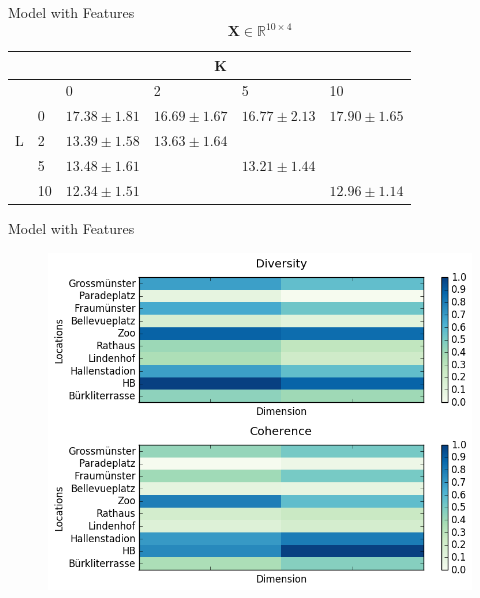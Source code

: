 \documentclass{beamer}
\begin{document}
\begin{frame}{Model with Features}
  \begin{equation*}
  \bm{X} \in \mathbb{R}^{10 \times 4}
  \end{equation*}
  
  \begin{table}
    \begin{tabular}{l|lllll}
      \hline
      & \multicolumn{5}{c}{K} \\
      \hline
      \multirow{5}{*}{L} & & 0 & 2 & 5 & 10 \\
      & 0 & $17.38 \pm 1.81$ & $16.69 \pm 1.67$ & $16.77 \pm 2.13$ & $17.90 \pm 1.65$ \\
      & 2 & $13.39 \pm 1.58$ & $13.63 \pm 1.64$ &&\\
      & 5 & $13.48 \pm 1.61$ && $13.21 \pm 1.44$ &\\
      & 10 & $12.34 \pm 1.51$ &&& $12.96 \pm 1.14$ \\
    \end{tabular}
  \end{table}
\end{frame}

\begin{frame}{Model with Features}
  \begin{figure}
    \centering
    \includegraphics[height=0.8\textheight]{submodular_weights_f_1_l_dim_2_k_dim_2}
  \end{figure}
\end{frame}
\end{document}

